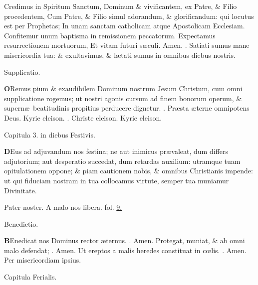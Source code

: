 \documentclass[letter,11pt]{book}
\makeatletter
\DeclareRobustCommand{\Vbar}{\vers@resp{-0.1em}{V}}
\DeclareRobustCommand{\Rbar}{\vers@resp{0pt}{R}}
\newcommand{\vers@resp@sym}{\raisebox{0.2ex}{\rotatebox[origin=c]{-20}{$\m@th\rceil$}}}
\newcommand{\vers@resp}[2]{%
  {\ooalign{\hidewidth\kern#1\vers@resp@sym\hidewidth\cr#2\cr}}%
}%
\def\V{\color{Red} \Vbar . \color{black}}
\def\R{\color{Red} \Rbar . \color{black}}
\makeatother
\begin{document}
\begin{multicols*}{2}
{\color{Red} C}redimus in Spiritum Sanctum, Dominum \& vivificantem, ex Patre, \& Filio procedentem,
{\color{Red} C}um Patre, \& Filio simul adorandum, \& glorificandum: qui locutus est per Prophetas;
{\color{Red} I}n unam sanctam catholicam atque Apostolicam Ecclesiam.
{\color{Red} C}onfitemur unum baptisma in remissionem peccatorum.
{\color{Red} E}xpectamus resurrectionem mortuorum,
{\color{Red} E}t vitam futuri s\ae culi. Amen.
\newline \V Satiati sumus mane misericordia tua: \& exultavimus, \& l\ae tati sumus in omnibus diebus nostris.
\vspace{-1.5em} \begin{center} \color{Red} Supplicatio. \end{center} \vspace{-.5em}
\lettrine[lines=2]{\bfseries \color{Red} O}{}Remus pium \& exaudibilem Dominum nostrum Jesum Christum, cum omni supplicatione rogemus; ut nostri agonis cursum ad finem bonorum operum, \& supern\ae \ beatitudinis propitius perducere dignetur. \R Pr\ae sta \ae terne omnipotens Deus. Kyrie eleison. \R Christe eleison. Kyrie eleison.
\vspace{-.5em} \begin{center} \color{Red} Capitula 3. in diebus Festivis. \end{center} \vspace{-.5em}
\lettrine[lines=2]{\bfseries \color{Red} D}{}Eus ad adjuvandum nos festina; ne aut inimicus pr\ae valeat, dum differs adjutorium; aut desperatio succedat, dum retardas auxilium: utramque tuam opitulationem oppone; \& piam cautionem nobis, \& omnibus Christianis impende: ut qui fiduciam nostram in tua collocamus virtute, semper tua muniamur Divinitate.
\par Pater noster.
\newline A malo nos libera. \color{Red} fol. \color{black} \hyperlink{page.9}{9.}
\vspace{-.5em} \begin{center} \color{Red} Benedictio. \end{center} \vspace{-.5em}
\lettrine[lines=2]{\bfseries \color{Red} B}{}Enedicat nos Dominus rector \ae ternus. \R Amen. Protegat, muniat, \& ab omni malo defendat; \R Amen. Ut ereptos a malis heredes constituat in c\oe lis. \R Amen. Per misericordiam ipsius.
\vspace{-.5em} \begin{center} \color{Red} Capitula Ferialis. \end{center} \vspace{-.5em}

\end{multicols*}
\end{document}
